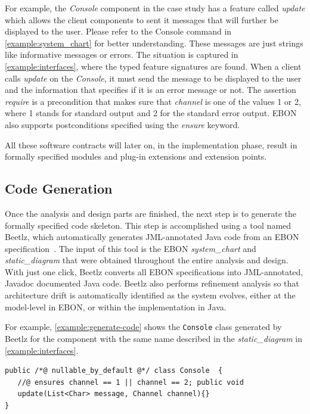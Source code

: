 \documentclass[conference]{IEEEtran}
\begin{document}
For example, the \emph{Console} component in the case study has a
feature called \emph{update} which allows the client components to
sent it messages that will further be displayed to the user. Please
refer to the Console command in \autoref{example:system_chart} for
better understanding.  These messages are just strings like
informative messages or errors.  The situation is captured in
\autoref{example:interfaces}, where the typed feature signatures are
found.  When a client calls \emph{update} on the \emph{Console}, it
must send the message to be displayed to the user and the information
that specifies if it is an error message or not. The assertion
\emph{require} is a precondition that makes sure that \emph{channel}
is one of the values 1 or 2, where 1 stands for standard output and 2
for the standard error output.  EBON also supports postconditions
specified using the \emph{ensure} keyword.

All these software contracts will later on, in the implementation
phase, result in formally specified modules and plug-in extensions and
extension points.

%
\subsection{Code Generation}
\label{sec:code-generation}

Once the analysis and design parts are finished, the next step is to
generate the formally specified code skeleton.  This step is
accomplished using a tool named Beetlz, which automatically generates
JML-annotated Java code from an EBON specification~\cite{Darulova09}.
The input of this tool is the EBON \emph{system\_chart} and
\emph{static\_diagram} that were obtained throughout the entire
analysis and design.  With just one click, Beetlz converts all EBON
specifications into JML-annotated, Javadoc documented Java code.
Beetlz also performs refinement analysis so that architecture drift is
automatically identified as the system evolves, either at the
model-level in EBON, or within the implementation in Java.

For example, \autoref{example:generate-code} shows the
\texttt{Console} class generated by Beetlz for the component with the
same name described in the \emph{static\_diagram} in
\autoref{example:interfaces}.

\begin{lstlisting}[label={example:generate-code},
caption={Java Console class generated by Beetlz}]
public /*@ nullable_by_default @*/ class Console  {
   //@ ensures channel == 1 || channel == 2; public void
   update(List<Char> message, Channel channel){}
}
\end{lstlisting}
\end{document}
